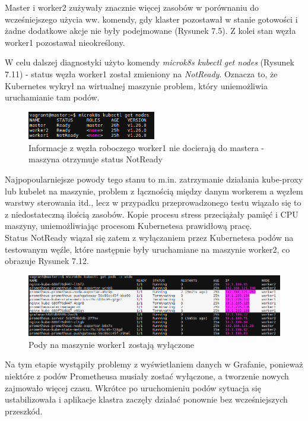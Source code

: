 Master i worker2 zużywały znacznie więcej zasobów w porównaniu do wcześniejszego użycia ww. komendy, gdy klaster pozostawał w stanie gotowości i żadne dodatkowe akcje nie były podejmowane (Rysunek 7.5). Z kolei stan węzła worker1 pozostawał nieokreślony. 

W celu dalszej diagnostyki użyto komendy \textit{microk8s kubectl get nodes} (Rysunek 7.11) - status węzła worker1 został zmieniony na \textit{NotReady}. Oznacza to, że Kubernetes wykrył na wirtualnej maszynie problem, który uniemożliwia uruchamianie tam podów. 

\begin{figure}[H]
    \centering
    \includegraphics[width=0.5\textwidth]{img2/test2/get-nodes.png}
    \caption{Informacje z węzła roboczego worker1 nie docierają do mastera - maszyna otrzymuje status NotReady}
\end{figure}

Najpopoularniejsze powody tego stanu to m.in. zatrzymanie działania kube-proxy lub kubelet na maszynie, problem z łącznością między danym workerem a węzłem warstwy sterowania itd., lecz w przypadku przeprowadzonego testu wiązało się to z niedostateczną ilością zasobów. Kopie procesu stress przeciążały pamięć i CPU maszyny, uniemożliwiając procesom Kubernetesa prawidłową pracę.\\

Status NotReady wiązał się zatem z wyłączaniem przez Kubernetesa podów na testowanym węźle, które następnie były uruchamiane na maszynie worker2, co obrazuje Rysunek 7.12. 

\begin{figure}[H]
    \centering
    \includegraphics[width=1\textwidth]{img2/test2/pods1.png}
    \caption{Pody na maszynie worker1 zostają wyłączone}
\end{figure}

Na tym etapie wystąpiły problemy z wyświetlaniem danych w Grafanie, ponieważ niektóre z podów Prometheusa musiały zostać wyłączone, a tworzenie nowych zajmowało więcej czasu. Wkrótce po uruchomieniu podów sytuacja się ustabilizowała i aplikacje klastra zaczęły działać ponownie bez wcześniejszych przeszkód.\\

